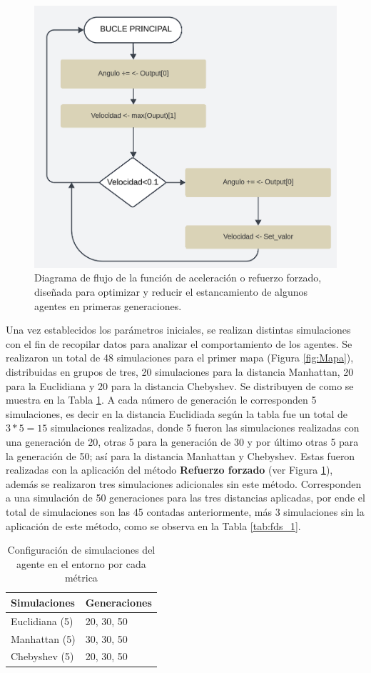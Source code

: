 \documentclass[lettersize, journal]{IEEEtran}
\begin{document}
\begin{figure}
    \centering
    \includegraphics[width=0.7\linewidth]{images/reforce.png}
    \caption{Diagrama de flujo de la función de aceleración o refuerzo forzado, diseñada para optimizar y reducir el estancamiento de algunos agentes en primeras generaciones.}
    \label{fig:reforce}
\end{figure}

Una vez establecidos los parámetros iniciales, se realizan distintas simulaciones con el fin de recopilar datos para analizar el comportamiento de los agentes. Se realizaron un total de 48 simulaciones para el primer mapa (Figura \ref{fig:Mapa}), distribuidas en grupos de tres, 20 simulaciones para la distancia Manhattan, 20 para la Euclidiana y 20 para la distancia Chebyshev. Se distribuyen de como se muestra en la Tabla \ref{tab:fds}. A cada número de generación le corresponden 5 simulaciones, es decir en la distancia Euclidiada según la tabla fue un total de $3*5 = 15$ simulaciones realizadas, donde 5 fueron las simulaciones realizadas con una generación de 20, otras 5 para la generación de 30 y por último otras 5 para la generación de 50; así para la distancia Manhattan y Chebyshev. Estas fueron realizadas con la aplicación del método \textbf{Refuerzo forzado} (ver Figura \ref{fig:reforce}), además se realizaron tres simulaciones adicionales sin este método. Corresponden a una simulación de 50 generaciones para las tres distancias aplicadas, por ende el total de simulaciones son las 45 contadas anteriormente, más 3 simulaciones sin la aplicación de este método, como se observa en la Tabla \ref{tab:fds_1}.

\begin{table}
\centering
\caption{Configuración de simulaciones del agente en el entorno por cada métrica}
\label{tab:fds}
\begin{tabular}{ll}
\toprule
\textbf{Simulaciones} & \textbf{Generaciones} \\
\midrule
Euclidiana (5)   &  20, 30, 50 \\
Manhattan (5)    & 30, 30, 50 \\
Chebyshev (5)    & 20, 30, 50 \\
\bottomrule
\end{tabular}
\end{table}
\end{document}
